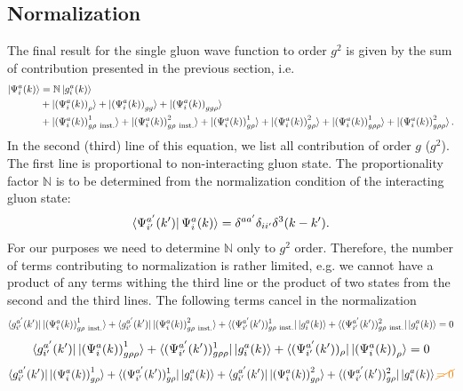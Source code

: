 \documentclass[aps,prd,amsmath,amssymb,nofootinbib]{revtex4-2}
\def\mf#1{\mathbb{#1}}
\numberwithin{equation}{section}
\begin{document}
\subsection{Normalization}
The final result for the single gluon wave function to order $g^2$ is given by the sum of contribution presented in the previous section, i.e. 
\begin{align}
  \ket{\Psi^{a}_{i}(k)}%
 & = \mf{N} \ket{ g_i^a(k) }%
 \\ \notag & + 
 \ket{ \left(\Psi^{a}_{i}(k) \right)_{\rho} }%
+\ket{ \left(\Psi^{a}_{i}(k) \right)_{gg} }%
+\ket{ \left(\Psi^{a}_{i}(k) \right)_{gg\rho} }%
\\ & +\ket{ \left(\Psi^{a}_{i}(k) \right)^{1}_{g \rho\ {\rm inst.} } }%
+\ket{ \left(\Psi^{a}_{i}(k) \right)^{2}_{g \rho\ {\rm inst.} } }%
+\ket{ \left(\Psi^{a}_{i}(k) \right)^{1}_{g \rho} }%
+\ket{ \left(\Psi^{a}_{i}(k) \right)^{2}_{g \rho} }%
+\ket{ \left(\Psi^{a}_{i}(k) \right)^{1}_{g\rho\rho} }%
+\ket{ \left(\Psi^{a}_{i}(k) \right)^{2}_{g\rho\rho} }. %
\label{Eq:intergluon}
\end{align}
In the second (third) line of this equation, we list all contribution of order $g$ ($g^2$). 
The first line is proportional to non-interacting gluon state. The proportionality factor  $\mf{N}$  is to be determined from the normalization 
condition of the interacting gluon state: 
\begin{align}
  \bra{\Psi^{a'}_{i'}(k')}%
  {\Psi^{a}_{i}(k)} \rangle%
  = \delta^{a a'} \delta_{i i'} \delta^{3}(k-k'). 
\end{align}
For our purposes we need to determine  $\mf{N}$ only to $g^2$ order. Therefore, the number of terms contributing to normalization is rather limited, 
e.g. we cannot have a product of any terms withing the third line or the product of two states from the second and the third lines. The following terms cancel in the normalization 
 $$  \bra{g^{a'}_{i'}(k')}\ket{ \left(\Psi^{a}_{i}(k) \right)^{1}_{g \rho\ {\rm inst.} } } + \bra{g^{a'}_{i'}(k')}\ket{ \left(\Psi^{a}_{i}(k) \right)^{2}_{g \rho\ {\rm inst.} } }+\bra{(\Psi^{a'}_{i'}(k'))^{1}_{g \rho\ {\rm inst.} } }\ket{g^{a}_{i}(k)} +\bra{(\Psi^{a'}_{i'}(k'))^{2}_{g \rho\ {\rm inst.} } }\ket{g^{a}_{i}(k)}  = 0 $$
 $$\bra{g^{a'}_{i'}(k')}\ket{ \left(\Psi^{a}_{i}(k) \right)^{1}_{g\rho\rho} }+ \bra{(\Psi^{a'}_{i'}(k'))^{1}_{g\rho\rho} }\ket{g^{a}_{i}(k)} + \bra{(\Psi^{a'}_{i'}(k'))_{\rho} }\ket{ \left(\Psi^{a}_{i}(k) \right)_{\rho} } = 0$$
 $$\bra{g^{a'}_{i'}(k')}\ket{ \left(\Psi^{a}_{i}(k) \right)^{1}_{g \rho} }+\bra{(\Psi^{a'}_{i'}(k'))^{1}_{g \rho} }\ket{g^{a}_{i}(k)} +\bra{g^{a'}_{i'}(k')}\ket{ \left(\Psi^{a}_{i}(k) \right)^{2}_{g \rho} }+\bra{(\Psi^{a'}_{i'}(k'))^{2}_{g \rho} }\ket{g^{a}_{i}(k)} {\color{orange}\cancel{= 0}}$$
\end{document}
